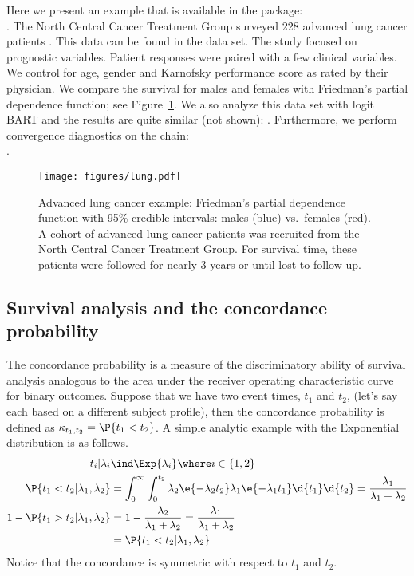 \documentclass[article]{jss}
\begin{document}
Here we present an example that is available in the  package:\\
.  The
North Central Cancer Treatment Group surveyed 228 advanced lung cancer
patients \citep{LoprLaur94}.  This data can be found in the
 data set.  The study focused on prognostic variables.
Patient responses were paired with a few clinical variables.  We
control for age, gender and Karnofsky performance score as rated by
their physician.  We compare the survival for males and females with
Friedman's partial dependence function; see Figure~\ref{lung}.  We
also analyze this data set with logit BART and the results are
quite similar (not shown): 
.
Furthermore, we perform convergence diagnostics on the chain:\\
.
\begin{figure}%
\begin{center}
\texttt{[image: figures/lung.pdf]}
\end{center}
\caption{\label{lung}Advanced lung cancer example: Friedman's partial
  dependence function with 95\% credible intervals: males (blue) vs.\
  females (red). A cohort of advanced lung cancer patients was
  recruited from the North Central Cancer Treatment Group. For
  survival time, these patients were followed for nearly 3 years or
  until lost to follow-up.}
\end{figure}

\subsection{Survival analysis and the concordance probability}

The concordance probability \citep{GoneHell05} is a measure of the
discriminatory ability of survival analysis analogous to the area
under the receiver operating characteristic curve for binary outcomes.
Suppose that we have two event times, $t_1$ and $t_2$, (let's say each
based on a different subject profile), then the concordance probability is
defined as $\kappa_{t_1, t_2}=\P{t_1<t_2}$.  A simple analytic example
with the Exponential distribution is as
follows. %
\begin{align*}
t_i|\lambda_i & \ind \Exp{\lambda_i} \where i \in \{1, 2\} \\
\P{t_1<t_2|\lambda_1, \lambda_2} & 
= \int_0^{\infty} \int_0^{t_2} \lambda_2 \e{-\lambda_2 t_2} 
              \lambda_1 \e{-\lambda_1 t_1} \d{t_1}  \d{t_2} 
              = \frac{\lambda_1}{\lambda_1+\lambda_2} \\
1-\P{t_1>t_2|\lambda_1, \lambda_2} & = 1- \frac{\lambda_2}{\lambda_1+\lambda_2}
  = \frac{\lambda_1}{\lambda_1+\lambda_2}\\
& = \P{t_1<t_2|\lambda_1, \lambda_2} 
\end{align*}
Notice that the concordance is symmetric with respect to $t_1$ and $t_2$.
\end{document}
